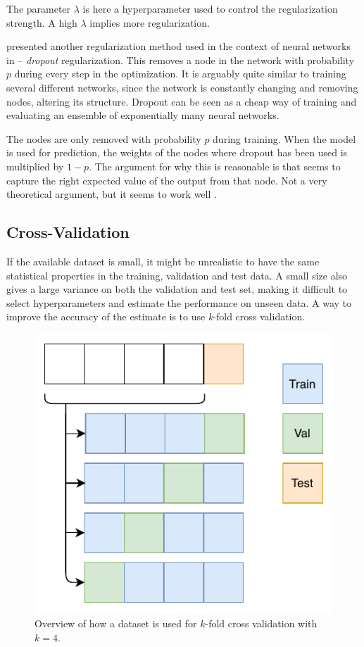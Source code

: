 The parameter $\lambda$ is here a hyperparameter used to control the regularization strength. A high $\lambda$ implies more regularization. 

\citeauthor{hinton2012improving} presented another regularization method used in the context of neural networks in \citeyear{hinton2012improving} --  \emph{dropout} regularization. This removes a node in the network with probability $p$ during every step in the optimization. It is arguably quite similar to training several different networks, since the network is constantly changing and removing nodes, altering its structure. Dropout can be seen as a cheap way of training and evaluating an ensemble of exponentially many neural networks. 

The nodes are only removed with probability $p$ during training. When the model is used for prediction, the weights of the nodes where dropout has been used is multiplied by $1 - p$. The argument for why this is reasonable is that seems to capture the right expected value of the output from that node. Not a very theoretical argument, but it seems to work well \citep{hinton2012improving}. 


\subsection{Cross-Validation}\label{sec:crossval}

If the available dataset is small, it might be unrealistic to have the same statistical properties in the training, validation and test data. A small size also gives a large variance on both the validation and test set, making it difficult to select hyperparameters and estimate the performance on unseen data. A way to improve the accuracy of the estimate is to use \emph{k}-fold cross validation.  

\begin{figure}[H]
    \centering
    \includegraphics{Figures/figs-k-fold.pdf}
    \caption{Overview of how a dataset is used for $k$-fold cross validation with $k=4$. }
    \label{fig:kfold}
\end{figure}

